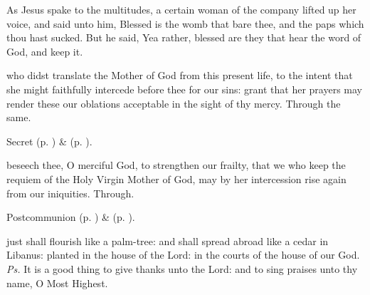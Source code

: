 
 As Jesus spake to the multitudes, a certain woman of the company lifted up her voice, and said unto him, Blessed is the womb that bare thee, and the paps which thou hast sucked. But he said, Yea rather, blessed are they that hear the word of God, and keep it.


\secret
{} who didst translate the Mother of God from this present life, to the intent that she might faithfully intercede before thee for our sins: grant that her prayers may render these our oblations acceptable in the sight of thy mercy. Through the same.

\begin{rubric}
	 Secret  (p. \pageref{EusebiusSecret}) \&   (p. \pageref{SPSaints}).
\end{rubric}


\postcommunion
{} beseech thee, O merciful God, to strengthen our frailty, that we who keep the requiem of the Holy Virgin Mother of God, may by her intercession rise again from our iniquities. Through.

\begin{rubric}
	 Postcommunion  (p. \pageref{EusebiusPostcommunion}) \&   (p. \pageref{SPSaints}).
\end{rubric}



\introit
{} just shall flourish like a palm-tree: and shall spread abroad like a cedar in Libanus: planted in the house of the Lord: in the courts of the house of our God. \textit{Ps.} It is a good thing to give thanks unto the Lord: and to sing praises unto thy name, O Most Highest.


